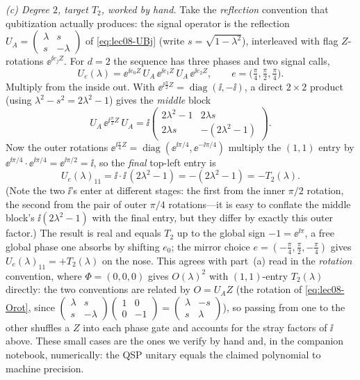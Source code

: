 \begin{example}
\emph{(c) Degree $2$, target $T_2$, worked by hand.} Take the \emph{reflection}
convention that qubitization actually produces: the signal operator is the reflection
$U_A=\left(\begin{smallmatrix}\lambda & s\\ s & -\lambda\end{smallmatrix}\right)$ of
\eqref{eq:lec08-UBj} (write $s=\sqrt{1-\lambda^2}$), interleaved with flag $Z$-rotations
$\ee^{\ii e_j Z}$. For $d=2$ the sequence has three phases and two signal calls,
\[
  U_e(\lambda)=\ee^{\ii e_0 Z}\,U_A\,\ee^{\ii e_1 Z}\,U_A\,\ee^{\ii e_2 Z},\qquad
  e=\bigl(\tfrac\pi4,\tfrac\pi2,\tfrac\pi4\bigr).
\]
Multiply from the inside out. With $\ee^{\ii\frac\pi2 Z}=\operatorname{diag}(\ii,-\ii)$,
a direct $2\times2$ product (using $\lambda^2-s^2=2\lambda^2-1$) gives the \emph{middle}
block
\[
  U_A\,\ee^{\ii\frac\pi2 Z}\,U_A
  =\ii\begin{pmatrix}2\lambda^2-1 & 2\lambda s\\[2pt]
       2\lambda s & -(2\lambda^2-1)\end{pmatrix}.
\]
Now the outer rotations
$\ee^{\ii\frac\pi4 Z}=\operatorname{diag}(\ee^{\ii\pi/4},\ee^{-\ii\pi/4})$ multiply the
$(1,1)$ entry by $\ee^{\ii\pi/4}\cdot\ee^{\ii\pi/4}=\ee^{\ii\pi/2}=\ii$, so the
\emph{final} top-left entry is
\[
  U_e(\lambda)_{11}=\ii\cdot\ii\,(2\lambda^2-1)=-(2\lambda^2-1)=-T_2(\lambda).
\]
(Note the two $\ii$'s enter at different stages: the first from the inner $\pi/2$
rotation, the second from the pair of outer $\pi/4$ rotations---it is easy to conflate
the middle block's $\ii(2\lambda^2-1)$ with the final entry, but they differ by exactly
this outer factor.) The result is real and equals $T_2$ up to the global sign
$-1=\ee^{\ii\pi}$, a free global phase one absorbs by shifting $e_0$; the mirror choice
$e=(-\tfrac\pi4,\tfrac\pi2,-\tfrac\pi4)$ gives $U_e(\lambda)_{11}=+T_2(\lambda)$ on the
nose. This agrees with part~(a) read in the \emph{rotation} convention, where
$\Phi=(0,0,0)$ gives $O(\lambda)^2$ with $(1,1)$-entry $T_2(\lambda)$ directly: the two
conventions are related by $O=U_A Z$ (the rotation of \eqref{eq:lec08-Orot}, since
$\left(\begin{smallmatrix}\lambda & s\\ s & -\lambda\end{smallmatrix}\right)
\left(\begin{smallmatrix}1 & 0\\ 0 & -1\end{smallmatrix}\right)
=\left(\begin{smallmatrix}\lambda & -s\\ s & \lambda\end{smallmatrix}\right)$), so passing
from one to the other shuffles a $Z$ into each phase gate and accounts for the stray
factors of $\ii$ above. These small cases are the ones we verify by hand and, in the
companion notebook, numerically: the QSP unitary equals the claimed polynomial to
machine precision.
\end{example}

